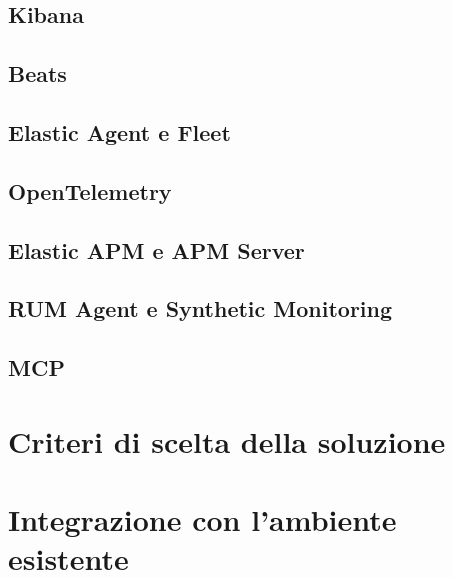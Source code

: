 \subsection*{Kibana}

\subsection*{Beats}

\subsection*{Elastic Agent e Fleet}

\subsection*{OpenTelemetry}

\subsection*{Elastic APM e APM Server}

\subsection*{RUM Agent e Synthetic Monitoring}

\subsection*{MCP}


\section{Criteri di scelta della soluzione}
\label{sec:criteri-scelta-soluzione}


\section{Integrazione con l'ambiente esistente}
\label{sec:integrazione-ambiente-esistente}








